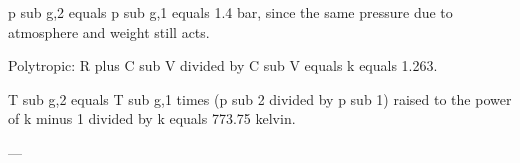 p sub g,2 equals p sub g,1 equals 1.4 bar, since the same pressure due to atmosphere and weight still acts.  

Polytropic:  
R plus C sub V divided by C sub V equals k equals 1.263.  

T sub g,2 equals T sub g,1 times (p sub 2 divided by p sub 1) raised to the power of k minus 1 divided by k equals 773.75 kelvin.  

---
